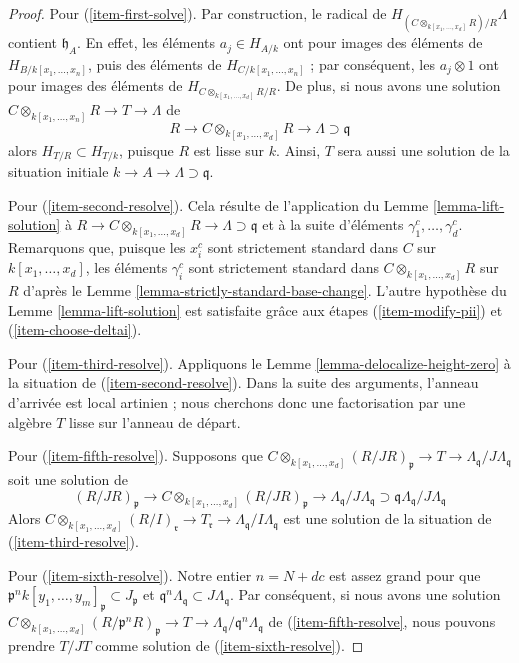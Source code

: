 \begin{proof}
\medskip\noindent
Pour (\ref{item-first-solve}). Par construction, le radical de
$H_{(C \otimes_{k[x_1, \ldots, x_d]} R)/R} \Lambda$ contient
$\mathfrak h_A$. En effet, les éléments $a_j \in H_{A/k}$
ont pour images des éléments de $H_{B/k[x_1, \ldots, x_n]}$, puis des éléments
de $H_{C/k[x_1, \ldots, x_n]}$ ; par conséquent, les $a_j \otimes 1$ ont pour images des éléments de
$H_{C \otimes_{k[x_1, \ldots, x_d]} R/R}$. De plus, si nous avons une solution
$C \otimes_{k[x_1, \ldots, x_n]} R \to T \to \Lambda$ de
$$
R
\to
C \otimes_{k[x_1, \ldots, x_d]} R
\to
\Lambda \supset \mathfrak q
$$
alors $H_{T/R} \subset H_{T/k}$, puisque $R$ est lisse sur $k$.
Ainsi, $T$ sera aussi une solution de
la situation initiale $k \to A \to \Lambda \supset \mathfrak q$.

\medskip\noindent
Pour (\ref{item-second-resolve}). Cela résulte de l'application du
Lemme \ref{lemma-lift-solution} à
$R \to C \otimes_{k[x_1, \ldots, x_d]} R
\to \Lambda \supset \mathfrak q$ et à la suite d'éléments
$\gamma_1^c, \ldots, \gamma_d^c$. Remarquons que, puisque les $x_i^c$
sont strictement standard dans $C$ sur $k[x_1, \ldots, x_d]$, les éléments
$\gamma_i^c$ sont strictement standard dans $C \otimes_{k[x_1, \ldots, x_d]} R$
sur $R$ d'après le Lemme \ref{lemma-strictly-standard-base-change}.
L'autre hypothèse du Lemme \ref{lemma-lift-solution} est satisfaite grâce aux étapes
(\ref{item-modify-pii}) et (\ref{item-choose-deltai}).

\medskip\noindent
Pour (\ref{item-third-resolve}). Appliquons le Lemme \ref{lemma-delocalize-height-zero}
à la situation de (\ref{item-second-resolve}). Dans la suite des
arguments, l'anneau d'arrivée est local artinien ; nous cherchons donc
une factorisation par une algèbre $T$ lisse sur l'anneau de départ.

\medskip\noindent
Pour (\ref{item-fifth-resolve}).
Supposons que $C \otimes_{k[x_1, \ldots, x_d]} (R/JR)_\mathfrak p \to
T \to \Lambda_\mathfrak q/J\Lambda_\mathfrak q$ soit une solution de
$$
(R/JR)_\mathfrak p \to
C \otimes_{k[x_1, \ldots, x_d]} (R/JR)_\mathfrak p \to
\Lambda_\mathfrak q/J\Lambda_\mathfrak q
\supset
\mathfrak q\Lambda_\mathfrak q/J\Lambda_\mathfrak q
$$
Alors $C \otimes_{k[x_1, \ldots, x_d]} (R/I)_\mathfrak r \to T_\mathfrak r \to
\Lambda_\mathfrak q/I\Lambda_\mathfrak q$
est une solution de la situation de (\ref{item-third-resolve}).

\medskip\noindent
Pour (\ref{item-sixth-resolve}). Notre entier $n = N + dc$ est assez grand pour que
$\mathfrak p^nk[y_1, \ldots, y_m]_\mathfrak p \subset J_\mathfrak p$
et $\mathfrak q^n \Lambda_\mathfrak q \subset J\Lambda_\mathfrak q$.
Par conséquent, si nous avons une solution
$C \otimes_{k[x_1, \ldots, x_d]} (R/\mathfrak p^nR)_\mathfrak p \to
T \to \Lambda_\mathfrak q/\mathfrak q^n\Lambda_\mathfrak q$
de (\ref{item-fifth-resolve},
nous pouvons prendre $T/JT$ comme solution de
(\ref{item-sixth-resolve}).


\end{proof}
